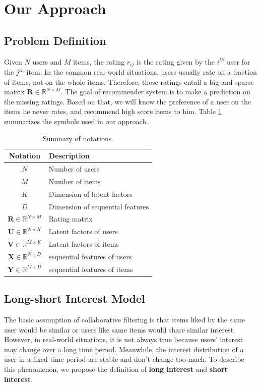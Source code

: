 \documentclass{llncs}
\begin{document}
\section{Our Approach}
\subsection{Problem Definition}
Given $N$ users and $M$ items, the rating $r_{ij}$ is the rating given by
the $i^{th}$ user for the $j^{th}$ item.
In the common real-world situations,
users usually rate on a fraction of items, not on the whole items.
Therefore,
those ratings entail a big and sparse matrix $\mathbf{R} \in \mathbb{R}^{N \times M}$.
The goal of recommender system is to make a prediction on the missing ratings.
Based on that, we will know the preference of a user on the items he never rates,
and recommend high score items to him.
Table \ref{tab:notations} summarizes the symbols used in our approach.

\begin{table}[htbp]
	\centering
	\caption{Summary of notations.}
	\label{tab:notations}
	\begin{tabular}{|c|l|}
		\hline
		\textbf{Notation} & \textbf{Description} \\
		\hline
		$N$ & Number of users \\
		$M$ & Number of items \\
		$K$ & Dimension of latent factors \\
		$D$ & Dimension of sequential features \\
		$\mathbf{R} \in \mathbb{R}^{N \times M}$ & Rating matrix \\
		$\mathbf{U} \in \mathbb{R}^{N \times K}$ & Latent factors of users \\
		$\mathbf{V} \in \mathbb{R}^{M \times K}$ & Latent factors of items \\
		$\mathbf{X} \in \mathbb{R}^{N \times D}$ & sequential features of users \\
		$\mathbf{Y} \in \mathbb{R}^{M \times D}$ & sequential features of items \\
		\hline
	\end{tabular}
\end{table}

\subsection{Long-short Interest Model}
The basic assumption of collaborative filtering is that items liked by the same user
would be similar or users like same items would share similar interest.
However, in real-world situations, it is not always true because users' interest
may change over a long time period.
Meanwhile, the interest distribution of a user in a fixed time period
are stable and don't change too much.
To describe this phenomenon,
we propose the definition of \textbf{long interest} and \textbf{short interest}.
\end{document}
